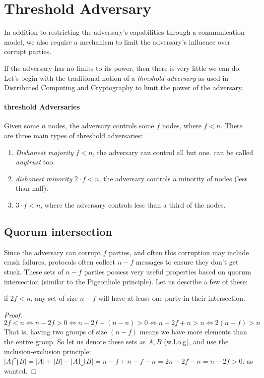 \section{Threshold Adversary}
In addition to restricting the adversary's capabilities through a communication model,
 we also require a mechanism to limit the adversary's influence over corrupt parties.

If the adversary has no limits to its power, then there is very little we can do.
Let's begin with the traditional notion of a \emph{threshold adversary} as used in Distributed 
Computing and Cryptography to limit the power of the adversary.


\paragraph{threshold Adversaries}
    Given some $n$ nodes, the adversary controls some $f$ nodes, where $f<n$.
    There are three main types of threshold adversaries:
\begin{enumerate}
    \item \emph{Dishonest majority} $f<n$, the adversary can control all but one. can be called \emph{anytrust} too.
    \item \emph{dishonest minority} $2\cdot f<n$, the adversary controls a minority of nodes (less than half).
    \item $3\cdot f < n$, where the adversary controls less than a third of the nodes.
\end{enumerate}

\subsection{Quorum intersection}
Since the adversary can corrupt $f$ parties, and often this corruption may include crash failures,
 protocols often collect $n-f$ messages to ensure they don't get stuck.
  These sets of $n-f$ parties possess very useful properties based on quorum intersection
   (similar to the Pigeonhole principle).
   Let us describe a few of these:

\begin{thm}
    if $2f<n$, any set of size $n-f$  will have at least one party in their
    intersection.
\end{thm} 
 \begin{proof}
    $2f<n \iff n-2f>0 \iff n-2f +(n-n) >0 \iff n-2f+n>n \iff 2(n-f)>n$
    That is, having two groups of size $(n-f)$ means we have more elements than the entire group.
    So let us denote these sets as $A,B$ (w.l.o.g), and use the 
    inclusion-exclusion principle:
    $|A\bigcap B| = |A| + |B| - |A\bigcup B| = n-f + n-f - n = 2n - 2f - n = n - 2f > 0$.
    as wanted.
 \end{proof}

